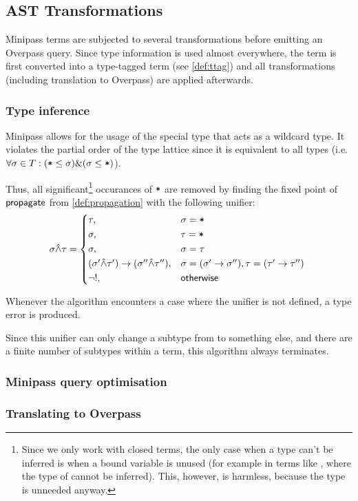 \documentclass[main.tex]{subfiles}
\begin{document}
\subsection{AST Transformations}
Minipass terms are subjected to several transformations before emitting
an Overpass query. Since type information is used almost everywhere,
the term is first converted into a type-tagged term (see \cref{def:ttag})
and all transformations (including translation to Overpass) are applied
afterwards.

\subsubsection{Type inference}
\label{sec:typeinf}
Minipass allows for the usage of the special type \code{*} that acts as a
wildcard type. It violates the partial order of the type lattice since it is
equivalent to all types (i.e. $\forall \sigma \in T: (\text{\mbox{\texttt{*}}} \leq \sigma)
\& (\sigma \leq \text{\mbox{\texttt{*}}})$).

Thus, all significant\footnote{
    Since we only work with closed terms, the only case when a type can't be
    inferred is when a bound variable is unused (for example in terms like
    , where the type of  cannot be inferred).
    This, however, is harmless, because the type is unneeded anyway.
} occurances of $\mbox{\texttt{*}}$ are removed by finding the fixed point of
$\mathsf{propagate}$ from \cref{def:propagation}
with the following unifier:
\[
    \sigma \unify \tau =
    \begin{cases*}
        \tau ,& $\sigma = \text{\code{*}}$ \\
        \sigma ,& $\tau = \text{\code{*}}$ \\
        \sigma ,& $\sigma = \tau$ \\
        (\sigma' \unify \tau') \tot (\sigma'' \unify \tau'') ,& 
            $\sigma = (\sigma' \tot \sigma''), \tau = (\tau' \tot \tau'')$ \\
        \lnot ! ,& $\mathsf{otherwise}$ \\
    \end{cases*}
\]

Whenever the algorithm encounters a case where the unifier is not defined,
a type error is produced.

Since this unifier can only change a subtype from \code{*} to something else,
and there are a finite number of subtypes within a term, this algorithm
always terminates.

\subsubsection{Minipass query optimisation}
\label{sec:optimisation}

\subsubsection{Translating to Overpass}
\end{document}
